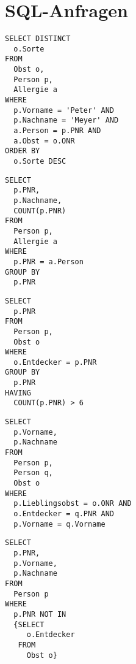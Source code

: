 \documentclass[ngerman]{gdb-aufgabenblatt}
\begin{document}
\newpage
\section{SQL-Anfragen}

\begin{compactenum}[(a)]
\item \begin{verbatim}
SELECT DISTINCT
  o.Sorte
FROM 
  Obst o,
  Person p,
  Allergie a
WHERE
  p.Vorname = 'Peter' AND
  p.Nachname = 'Meyer' AND
  a.Person = p.PNR AND
  a.Obst = o.ONR
ORDER BY
  o.Sorte DESC
\end{verbatim}
\item \begin{verbatim}
SELECT
  p.PNR,
  p.Nachname,
  COUNT(p.PNR)
FROM 
  Person p,
  Allergie a
WHERE
  p.PNR = a.Person
GROUP BY
  p.PNR
\end{verbatim}
\item \begin{verbatim}
SELECT
  p.PNR
FROM 
  Person p,
  Obst o
WHERE
  o.Entdecker = p.PNR
GROUP BY
  p.PNR
HAVING
  COUNT(p.PNR) > 6
\end{verbatim}
\item \begin{verbatim}
SELECT
  p.Vorname,
  p.Nachname
FROM 
  Person p,
  Person q,
  Obst o
WHERE
  p.Lieblingsobst = o.ONR AND
  o.Entdecker = q.PNR AND
  p.Vorname = q.Vorname
\end{verbatim}
\item \begin{verbatim}
SELECT
  p.PNR,
  p.Vorname,
  p.Nachname
FROM 
  Person p
WHERE
  p.PNR NOT IN
  {SELECT 
     o.Entdecker
   FROM
     Obst o}
\end{verbatim}

\end{compactenum}
\end{document}
